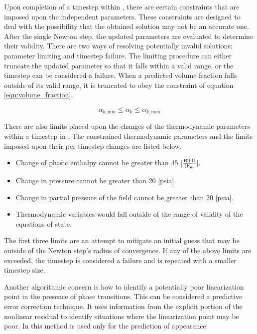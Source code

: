 Upon completion of a timestep within \cobra{}, there are certain constraints that are imposed upon the independent parameters.
These constraints are designed to deal with the possibility that the obtained solution may not be an accurate one.
After the single Newton step, the updated parameters are evaluated to determine their validity.
There are two ways of resolving potentially invalid solutions: parameter limiting and timestep failure.
The limiting procedure can either truncate the updated parameter so that it falls within a valid range, or the timestep can be considered a failure.
When a predicted volume fraction falls outside of its valid range, it is truncated to obey the constraint of equation \eqref{eqn:volume_fraction}.

\begin{equation}
\label{eqn:volume_fraction}
\alpha_{k,\text{min}} \leq \alpha_k \leq \alpha_{k,\text{max}} 
\end{equation}

There are also limits placed upon the changes of the thermodynamic parameters within a timestep in \cobra{}.
The constrained thermodynamic parameters and the limits imposed upon their per-timestep changes are listed below.

\begin{itemize}
\item{Change of phasic enthalpy cannot be greater than $45$ [$\frac{\text{BTU}}{\lbm{}}$].}
\item{Change in pressure cannot be greater than $20$ [psia].}
\item{Change in partial pressure of the \ncg{} field cannot be greater than $20$ [psia].}
\item{Thermodynamic variables would fall outside of the range of validity of the equations of state.}
\end{itemize}

The first three limits are an attempt to mitigate an initial guess that may be outside of the Newton step's radius of convergence.
If any of the above limits are exceeded, the timestep is considered a failure and is repeated with a smaller timestep size.

Another algorithmic concern is how to identify a potentially poor linearization point in the presence of phase transitions. 
This can be considered a predictive error correction technique.
It uses information from the explicit portion of the nonlinear residual to identify situations where the linearization point may be poor.
In \cobra{} this method is used only for the prediction of \ncg{} appearance.

